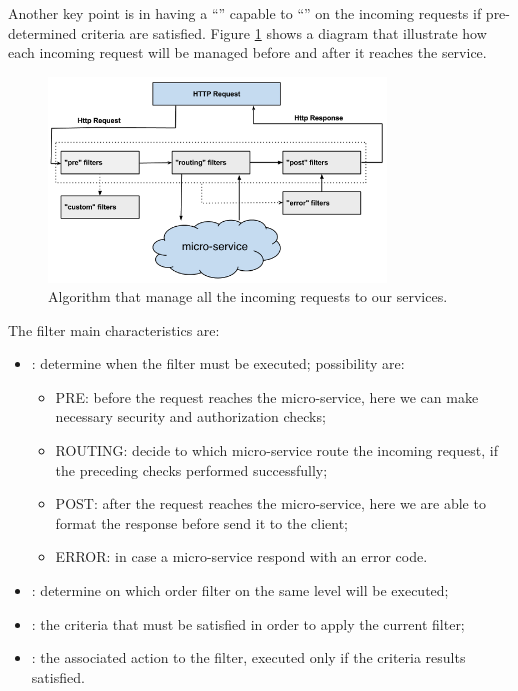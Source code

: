 Another key point is in having a ``'' capable to ``'' on the
incoming requests if pre-determined criteria are satisfied. Figure 
\ref{img:architecture-proposal-architecture-ingress} shows a diagram that illustrate how each incoming request
will be managed before and after it reaches the service.

\begin{figure}
	\centering{}
	\includegraphics[width=0.8\textwidth]{chapters/architecture/images/ingress-design.png}
	\caption[Request management by ingress]{Algorithm that manage all the incoming requests to our
		services.}
	\label{img:architecture-proposal-architecture-ingress}
\end{figure}

The filter main characteristics are:

\begin{itemize}
	\item{: determine when the filter must be executed; possibility are:}
	\begin{itemize}
		\item{PRE: before the request reaches the micro-service, here we can make necessary security
			and authorization checks;}
		\item{ROUTING: decide to which micro-service route the incoming request, if the preceding
			checks performed successfully;}
		\item{POST: after the request reaches the micro-service, here we are able to format the response
			before send it to the client;}
		\item{ERROR: in case a micro-service respond with an error code.}
	\end{itemize}
	\item{: determine on which order filter on the same level will be executed;}
	\item{: the criteria that must be satisfied in order to apply the current filter;}
	\item{: the associated action to the filter, executed only if the criteria results
		satisfied.}
\end{itemize}


